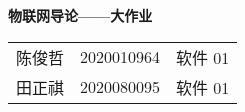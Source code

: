\begin{center}
    \Large\textbf{物联网导论——大作业}

    \normalsize
    \vspace{1em}
    \begin{tabular}{ccc}
        陈俊哲 & 2020010964 & 软件 01 \\
        田正祺 & 2020080095 & 软件 01 
    \end{tabular}
\end{center}